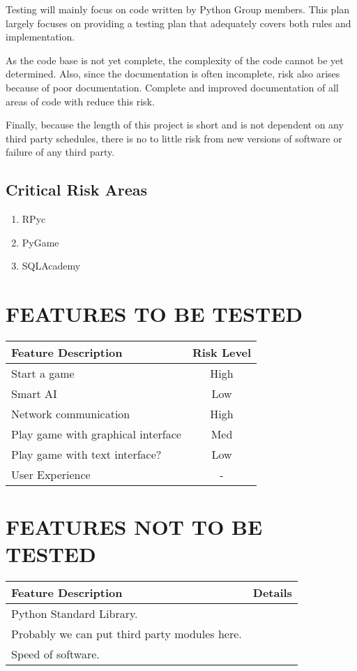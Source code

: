 \documentclass[report]{article}
\begin{document}
Testing will mainly focus on code written by Python Group members. This plan largely focuses on providing a testing plan that adequately covers both rules and implementation.

As the code base is not yet complete, the complexity of the code cannot be yet determined. Also, since the documentation is often incomplete, risk also arises because of poor documentation. Complete and improved documentation of all areas of code with reduce this risk.

Finally, because the length of this project is short and is not dependent on any third party schedules, there is no to little risk from new versions of software or failure of any third party.

\subsection{Critical Risk Areas}
\begin{enumerate}
\item RPyc
\item PyGame
\item SQLAcademy
\end{enumerate} 

\section[FEATURES TO BE TESTED]{FEATURES TO BE TESTED}
\begin{center}
\begin{tabularx}{\textwidth}{| X | c |}
  \hline
  \textbf{Feature Description} &
    \textbf{Risk Level} 
\\ \hline
Start a game & High
\\ \hline
Smart AI & Low
\\ \hline
Network communication & High
\\ \hline
Play game with graphical interface & Med
\\ \hline
Play game with text interface? & Low
\\ \hline
User Experience & -
\\ \hline
\end{tabularx}
\end{center}

\section[FEATURES NOT TO BE TESTED]{FEATURES NOT TO BE TESTED}
\begin{center}
\begin{tabularx}{\textwidth}{| X | X |}
  \hline
  \textbf{Feature Description} &
    \textbf{Details} 
\\ \hline
 Python Standard Library.
 \\ \hline
 Probably we can put third party modules here.
 \\ \hline
 Speed of software.
\\ \hline

\end{tabularx}
\end{center}
\end{document}
